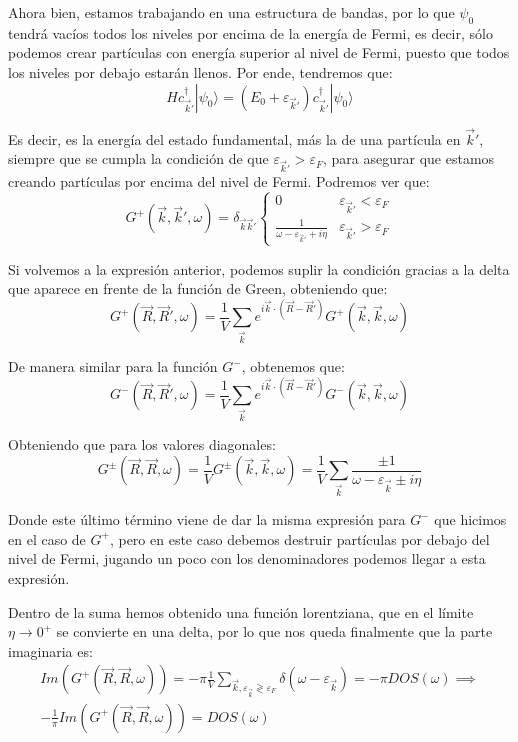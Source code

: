 \documentclass[12pt,twoside]{article}
\begin{document}
Ahora bien, estamos trabajando en una estructura de bandas, por lo que $\psi_0$ tendrá vacíos todos los niveles por encima de la energía de Fermi, es decir, sólo podemos crear partículas con energía superior al nivel de Fermi, puesto que todos los niveles por debajo estarán llenos. Por ende, tendremos que:
$$
Hc_{\vec{k}'}^{\dagger}|\psi_0\rangle = \left(E_0 + \varepsilon_{\vec{k}'}\right)c_{\vec{k}'}^{\dagger}|\psi_0\rangle
$$

Es decir, es la energía del estado fundamental, más la de una partícula en $\vec{k}'$, siempre que se cumpla la condición de que $\varepsilon_{\vec{k}'} > \varepsilon_F$, para asegurar que estamos creando partículas por encima del nivel de Fermi. Podremos ver que:
$$
G^+(\vec{k}, \vec{k}', \omega) = \delta_{\vec{k}\vec{k}'}\left\{\begin{array}{cc}
  0 & \varepsilon_{\vec{k}'} < \varepsilon_F \\
  \frac{1}{\omega - \varepsilon_{\vec{k}'} + i\eta} & \varepsilon_{\vec{k}'} > \varepsilon_F
\end{array}\right.
$$

Si volvemos a la expresión anterior, podemos suplir la condición gracias a la delta que aparece en frente de la función de Green, obteniendo que:
$$
G^+(\vec{R}, \vec{R}', \omega) = \frac{1}{V}\sum_{\vec{k}}e^{i\vec{k}\cdot\left(\vec{R} - \vec{R}'\right)}G^+(\vec{k}, \vec{k}, \omega)
$$

De manera similar para la función $G^-$, obtenemos que:
$$
G^-(\vec{R}, \vec{R}', \omega) = \frac{1}{V}\sum_{\vec{k}}e^{i\vec{k}\cdot\left(\vec{R} - \vec{R}'\right)}G^-(\vec{k}, \vec{k}, \omega)
$$

Obteniendo que para los valores diagonales:
$$
G^{\pm}(\vec{R}, \vec{R}, \omega) = \frac{1}{V}G^{\pm}(\vec{k}, \vec{k}, \omega) = \frac{1}{V}\sum_{\vec{k}}\frac{\pm 1}{\omega - \varepsilon_{\vec{k}} \pm i\eta}
$$

Donde este último término viene de dar la misma expresión para $G^-$ que hicimos en el caso de $G^+$, pero en este caso debemos destruir partículas por debajo del nivel de Fermi, jugando un poco con los denominadores podemos llegar a esta expresión.

Dentro de la suma hemos obtenido una función lorentziana, que en el límite $\eta\to 0^+$ se convierte en una delta, por lo que nos queda finalmente que la parte imaginaria es:
\begin{equation}
  \begin{split}
    Im(G^+(\vec{R}, \vec{R}, \omega)) = -\pi\frac{1}{V}\sum_{\vec{k}, \varepsilon_{\vec{k}}\gtrless\varepsilon_F}\delta(\omega - \varepsilon_{\vec{k}}) = -\pi DOS(\omega) \implies \\ -\frac{1}{\pi}Im\left(G^+\left(\vec{R}, \vec{R}, \omega\right)\right) = DOS\left(\omega\right)
  \end{split}
\end{equation}
\end{document}
